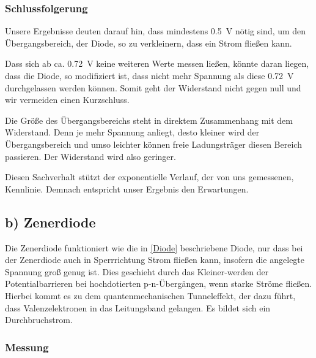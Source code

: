 \documentclass[11pt,a4paper,titlepage, ngerman]{article}
\begin{document}
			\subsubsection{Schlussfolgerung}
			
				Unsere Ergebnisse deuten darauf hin, dass mindestens \SI{0.5}{\V} nötig sind, um den Übergangsbereich, der Diode, so zu verkleinern, dass ein Strom fließen kann. 
				
				Dass sich ab ca. \SI{0.72}{\V} keine weiteren Werte messen ließen, könnte daran liegen, dass die Diode, so modifiziert ist, dass nicht mehr Spannung als diese \SI{0.72}{\V} durchgelassen werden können. Somit geht der Widerstand nicht gegen null und wir vermeiden einen Kurzschluss.
				
				Die Größe des Übergangsbereichs steht in direktem Zusammenhang mit dem Widerstand.  Denn je mehr Spannung anliegt, desto kleiner wird der Übergangsbereich und umso leichter können freie Ladungsträger diesen Bereich passieren. Der Widerstand wird also geringer.
				
				Diesen Sachverhalt stützt der exponentielle Verlauf, der von uns gemessenen, Kennlinie. Demnach entspricht unser Ergebnis den Erwartungen.
				
		\subsection{b) Zenerdiode} 
			
			Die Zenerdiode funktioniert wie die in \ref{Diode} beschriebene Diode, nur dass bei der Zenerdiode auch in Sperrrichtung Strom fließen kann, insofern die angelegte Spannung groß genug ist. Dies geschieht durch das Kleiner-werden der Potentialbarrieren bei hochdotierten p-n-Übergängen, wenn starke Ströme fließen. Hierbei kommt es zu dem quantenmechanischen Tunneleffekt, der dazu führt, dass Valenzelektronen in das Leitungsband gelangen. Es bildet sich ein Durchbruchstrom.
			
			\subsubsection{Messung}
			
\end{document}
